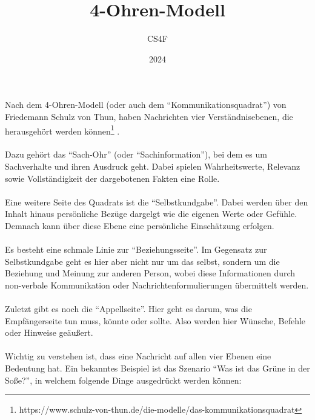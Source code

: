 \documentclass[a4paper]{article}
\title{\vspace{-2cm}4-Ohren-Modell}
\author{CS4F}
\date{2024}
\begin{document}
\maketitle


Nach dem 4-Ohren-Modell (oder auch dem "`Kommunikationsquadrat"') von Friedemann Schulz von Thun, haben Nachrichten vier Verständnisebenen, die herausgehört werden können\footnote{https://www.schulz-von-thun.de/die-modelle/das-kommunikationsquadrat}
.\\\\ Dazu gehört das "`Sach-Ohr"' (oder "`Sachinformation"'), bei dem es um Sachverhalte und ihren Ausdruck geht. Dabei spielen Wahrheitswerte, Relevanz sowie Vollständigkeit der dargebotenen Fakten eine Rolle.\\\\
Eine weitere Seite des Quadrats ist die "`Selbstkundgabe"'. Dabei werden über den Inhalt hinaus persönliche Bezüge dargelgt wie die eigenen Werte oder Gefühle. Demnach kann über diese Ebene eine persönliche Einschätzung erfolgen.\\\\
Es besteht eine schmale Linie zur "`Beziehungsseite"'. Im Gegensatz zur Selbstkundgabe geht es hier aber nicht nur um das selbst, sondern um die Beziehung und Meinung zur anderen Person, wobei diese Informationen durch non-verbale Kommunikation oder Nachrichtenformulierungen übermittelt werden.\\\\
Zuletzt gibt es noch die "`Appellseite"'. Hier geht es darum, was die Empfängerseite tun muss, könnte oder sollte. Also werden hier Wünsche, Befehle oder Hinweise geäußert.\\\\
Wichtig zu verstehen ist, dass eine Nachricht auf allen vier Ebenen eine Bedeutung hat. Ein bekanntes Beispiel ist das Szenario "`Was ist das Grüne in der Soße?"', in welchem folgende Dinge ausgedrückt werden können:\\
\end{document}
